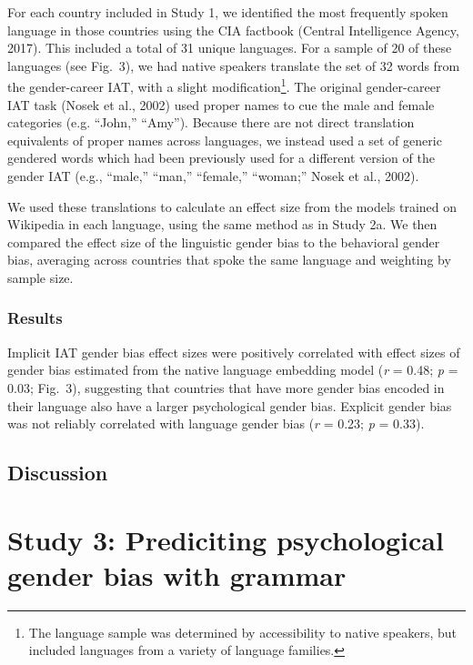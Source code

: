 \documentclass[10pt, letterpaper]{article}
\begin{document}
For each country included in Study 1, we identified the most frequently
spoken language in those countries using the CIA factbook (Central
Intelligence Agency, 2017). This included a total of 31 unique
languages. For a sample of 20 of these languages (see Fig.~3), we had
native speakers translate the set of 32 words from the gender-career
IAT, with a slight
modification\footnote{The language sample was determined by accessibility to native speakers, but included languages from a variety of language families.}.
The original gender-career IAT task (Nosek et al., 2002) used proper
names to cue the male and female categories (e.g. ``John,'' ``Amy'').
Because there are not direct translation equivalents of proper names
across languages, we instead used a set of generic gendered words which
had been previously used for a different version of the gender IAT
(e.g., ``male,'' ``man,'' ``female,'' ``woman;'' Nosek et al., 2002).

We used these translations to calculate an effect size from the models
trained on Wikipedia in each language, using the same method as in Study
2a. We then compared the effect size of the linguistic gender bias to
the behavioral gender bias, averaging across countries that spoke the
same language and weighting by sample size.

\subsubsection{Results}\label{results-2}

Implicit IAT gender bias effect sizes were positively correlated with
effect sizes of gender bias estimated from the native language embedding
model (\emph{r} = 0.48; \emph{p} = 0.03; Fig.~3), suggesting that
countries that have more gender bias encoded in their language also have
a larger psychological gender bias. Explicit gender bias was not
reliably correlated with language gender bias (\emph{r} = 0.23; \emph{p}
= 0.33).

\subsection{Discussion}\label{discussion-1}

\section{Study 3: Prediciting psychological gender bias with
grammar}\label{study-3-prediciting-psychological-gender-bias-with-grammar}
\end{document}
